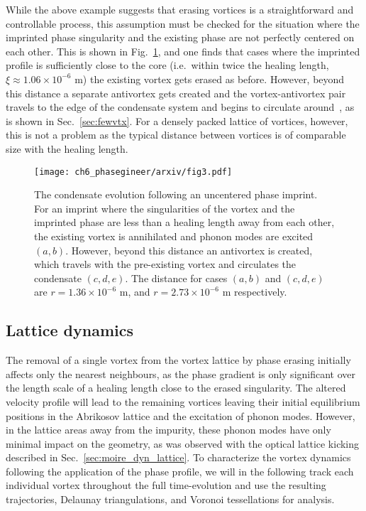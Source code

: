 While the above example suggests that erasing vortices is a straightforward and controllable process, this assumption must be checked for the situation where the imprinted phase singularity and the existing phase are not perfectly centered on each other. This is shown in Fig.~\ref{fig:annihilation_1vtx_uncentred}, and one finds that cases where the imprinted profile is sufficiently close to the core (i.e.\ within twice the healing length, $\xi\approx1.06\times 10^{-6}$ m) the existing vortex gets erased as before. However, beyond this distance a separate antivortex gets created and the vortex-antivortex pair travels to the edge of the condensate system and begins to circulate around~\cite{VTX:Martikainen_pra_2001}, as is shown in Sec.~\ref{sec:fewvtx}. For a densely packed lattice of vortices, however, this is not a problem as the typical distance between vortices is of comparable size with the healing length.

\begin{figure}\centering
    \texttt{[image: ch6\_phasegineer/arxiv/fig3.pdf]}
    \caption{The condensate evolution following an uncentered phase imprint. For an imprint where the singularities of the vortex and the imprinted phase are less than a healing length away from each other, the existing vortex is annihilated and phonon modes are excited $(a,b)$. However, beyond this distance an antivortex is created, which travels with the pre-existing vortex and circulates the condensate $(c,d,e)$. The distance for cases $(a,b)$ and $(c,d,e)$ are $r = 1.36\times10^{-6}$ m, and $r =2.73 \times10^{-6}$ m respectively.}\label{fig:annihilation_1vtx_uncentred}
\end{figure}


\subsection{Lattice dynamics}


The removal of a single vortex from the vortex lattice by phase erasing initially affects only the nearest neighbours, as the phase gradient is only significant over the length scale of a healing length close to the erased singularity. The altered velocity profile will lead to the remaining vortices leaving their initial equilibrium positions in the Abrikosov lattice and the excitation of phonon modes. However, in the lattice areas away from the impurity, these phonon modes have only minimal impact on the geometry, as was observed with the optical lattice kicking described in Sec.~\ref{sec:moire_dyn_lattice}. To characterize the vortex dynamics following the application of the phase profile, we will in the following track each individual vortex throughout the full time-evolution and use the resulting trajectories, Delaunay triangulations, and Voronoi tessellations for analysis.

